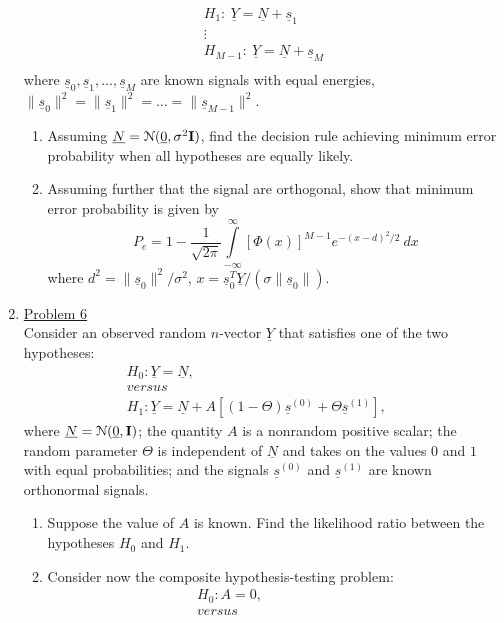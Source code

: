 \documentclass[a4paper,english,12pt]{article}
\newcommand{\ubar}[1]{\underline{#1}}
\begin{document}
\begin{enumerate}
\begin{eqnarray*}
H_1:~\ubar{Y}=\ubar{N}+\ubar{s}_1\\
\vdots\hspace{30pt}\\
H_{M-1}:~\ubar{Y}=\ubar{N}+\ubar{s}_M\\
\end{eqnarray*}
where $\ubar{s}_0,\ubar{s}_1,\dots,\ubar{s}_M$ are known signals with equal energies, $\|\ubar{s}_0\|^2=\|\ubar{s}_1\|^2=\dots=\|\ubar{s}_{M-1}\|^2$.
\begin{enumerate}
\item Assuming $\ubar{N}=\mathcal{N}(\ubar{0},\sigma^2 {\bf I})$, find the decision rule achieving minimum error probability when all hypotheses are equally likely.
\item Assuming further that the signal are orthogonal, show that minimum error probability is given by
\begin{equation*}
P_e=1-\frac{1}{\sqrt{2\pi}}\int\limits_{-\infty}^{\infty} \left[\Phi(x)\right]^{M-1}e^{-(x-d)^2/2}~dx
\end{equation*}
where $d^2=\|\ubar{s}_0\|^2/\sigma^2$, $x=\ubar{s}_0^T\ubar{Y}/(\sigma \|\ubar{s}_0\|)$.
\end{enumerate}
\item  \hyperlink{solution6}{Problem 6}\\
Consider an observed random $n$-vector $\ubar{Y}$ that satisfies one of the two hypotheses:
\begin{gather*}
H_0: \ubar{Y}=\ubar{N},\\
versus\hspace{200pt}\\
H_1: \ubar{Y}=\ubar{N}+A\left[(1-\Theta)\ubar{s}^{(0)}+\Theta\ubar{s}^{(1)}\right],
\end{gather*}
where $\ubar{N}=\mathcal{N}(\ubar{0},{\bf I})$; the quantity $A$ is a nonrandom positive scalar; the random parameter $\Theta$ is independent of $\ubar{N}$ and takes on the values $0$ and $1$ with equal probabilities; and the signals $\ubar{s}^{(0)}$ and $\ubar{s}^{(1)}$ are known orthonormal signals.
\begin{enumerate}
\item Suppose the value of $A$ is known. Find the likelihood ratio between the hypotheses $H_0$ and $H_1$.
\item Consider now the composite hypothesis-testing problem:
\begin{gather*}
H_0: A=0,\\
versus\hspace{100pt}\\

\end{gather*}
\end{enumerate}
\end{enumerate}
\end{document}
